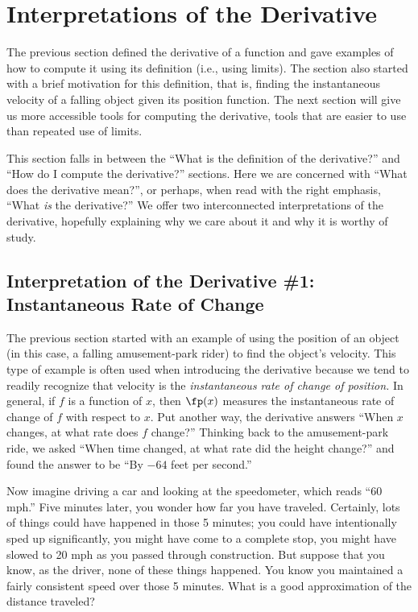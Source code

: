 \section{Interpretations of the Derivative}\label{sec:interp_deriv}

The previous section defined the derivative of a function and gave examples of how to compute it using its definition (i.e., using limits). The section also started with a brief motivation for this definition, that is, finding the instantaneous velocity of a falling object given its position function. The next section will give us more accessible tools for computing the derivative, tools that are easier to use than repeated use of limits.

This section falls in between the ``What is the definition of the derivative?'' and ``How do I compute the derivative?'' sections. Here we are concerned with ``What does the derivative mean?'', or perhaps, when read with the right emphasis, ``What \emph{is} the derivative?'' We offer two interconnected interpretations of the derivative, hopefully explaining why we care about it and why it is worthy of study.

\subsection{Interpretation of the Derivative \#1: Instantaneous Rate of Change}

The previous section started with an example of using the position of an object (in this case, a falling amusement-park rider) to find the object's velocity. This type of example is often used when introducing the derivative because we tend to readily recognize that velocity is the \emph{instantaneous rate of change of position.} In general, if $f$ is a function of $x$, then $\fp(x)$ measures the instantaneous rate of change of $f$ with respect to $x$. Put another way, the derivative answers ``When $x$ changes, at what rate does $f$ change?'' Thinking back to the amusement-park ride, we asked ``When time changed, at what rate did the height change?'' and found the answer to be ``By $-64$ feet per second.'' 

Now imagine driving a car and looking at the speedometer, which reads ``60 mph.'' Five minutes later, you wonder how far you have traveled. Certainly, lots of things could have happened in those 5 minutes; you could have intentionally sped up significantly, you might have come to a complete stop, you might have slowed to 20 mph as you passed through construction.  But suppose that you know, as the driver, none of these things happened. You know you maintained a fairly consistent speed over those 5 minutes. What is a good approximation of the distance traveled?

